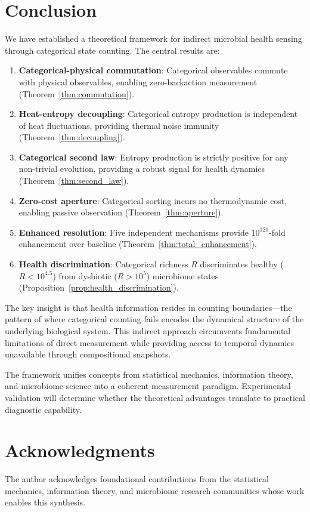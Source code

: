 \documentclass[twocolumn,10pt]{article}
\begin{document}
\section{Conclusion}

We have established a theoretical framework for indirect microbial health sensing through categorical state counting. The central results are:

\begin{enumerate}
    \item \textbf{Categorical-physical commutation}: Categorical observables commute with physical observables, enabling zero-backaction measurement (Theorem~\ref{thm:commutation}).

    \item \textbf{Heat-entropy decoupling}: Categorical entropy production is independent of heat fluctuations, providing thermal noise immunity (Theorem~\ref{thm:decoupling}).

    \item \textbf{Categorical second law}: Entropy production is strictly positive for any non-trivial evolution, providing a robust signal for health dynamics (Theorem~\ref{thm:second_law}).

    \item \textbf{Zero-cost aperture}: Categorical sorting incurs no thermodynamic cost, enabling passive observation (Theorem~\ref{thm:aperture}).

    \item \textbf{Enhanced resolution}: Five independent mechanisms provide $10^{121}$-fold enhancement over baseline (Theorem~\ref{thm:total_enhancement}).

    \item \textbf{Health discrimination}: Categorical richness $R$ discriminates healthy ($R < 10^{4.5}$) from dysbiotic ($R > 10^5$) microbiome states (Proposition~\ref{prop:health_discrimination}).
\end{enumerate}

The key insight is that health information resides in counting boundaries---the pattern of where categorical counting fails encodes the dynamical structure of the underlying biological system. This indirect approach circumvents fundamental limitations of direct measurement while providing access to temporal dynamics unavailable through compositional snapshots.

The framework unifies concepts from statistical mechanics, information theory, and microbiome science into a coherent measurement paradigm. Experimental validation will determine whether the theoretical advantages translate to practical diagnostic capability.

\section*{Acknowledgments}

The author acknowledges foundational contributions from the statistical mechanics, information theory, and microbiome research communities whose work enables this synthesis.



\end{document}
